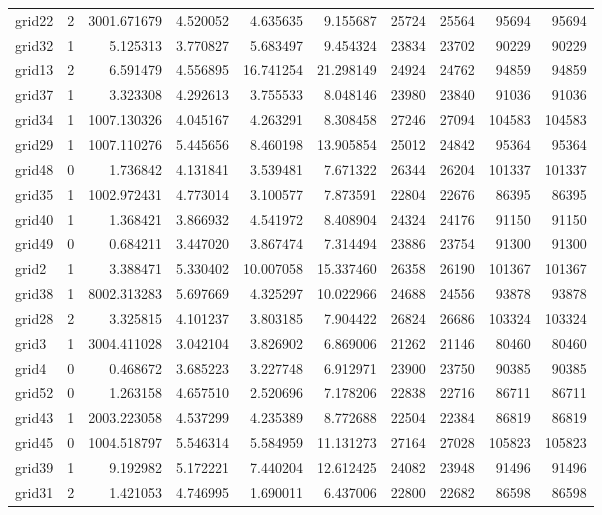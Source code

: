 \begin{longtable}{|l|r|r|r|r|r|r|r|r|r|}
grid22 & 2 & 3001.671679 & 4.520052 & 4.635635 & 9.155687 & 25724 & 25564 & 95694 & 95694 \\
grid32 & 1 & 5.125313 & 3.770827 & 5.683497 & 9.454324 & 23834 & 23702 & 90229 & 90229 \\
grid13 & 2 & 6.591479 & 4.556895 & 16.741254 & 21.298149 & 24924 & 24762 & 94859 & 94859 \\
grid37 & 1 & 3.323308 & 4.292613 & 3.755533 & 8.048146 & 23980 & 23840 & 91036 & 91036 \\
grid34 & 1 & 1007.130326 & 4.045167 & 4.263291 & 8.308458 & 27246 & 27094 & 104583 & 104583 \\
grid29 & 1 & 1007.110276 & 5.445656 & 8.460198 & 13.905854 & 25012 & 24842 & 95364 & 95364 \\
grid48 & 0 & 1.736842 & 4.131841 & 3.539481 & 7.671322 & 26344 & 26204 & 101337 & 101337 \\
grid35 & 1 & 1002.972431 & 4.773014 & 3.100577 & 7.873591 & 22804 & 22676 & 86395 & 86395 \\
grid40 & 1 & 1.368421 & 3.866932 & 4.541972 & 8.408904 & 24324 & 24176 & 91150 & 91150 \\
grid49 & 0 & 0.684211 & 3.447020 & 3.867474 & 7.314494 & 23886 & 23754 & 91300 & 91300 \\
grid2 & 1 & 3.388471 & 5.330402 & 10.007058 & 15.337460 & 26358 & 26190 & 101367 & 101367 \\
grid38 & 1 & 8002.313283 & 5.697669 & 4.325297 & 10.022966 & 24688 & 24556 & 93878 & 93878 \\
grid28 & 2 & 3.325815 & 4.101237 & 3.803185 & 7.904422 & 26824 & 26686 & 103324 & 103324 \\
grid3 & 1 & 3004.411028 & 3.042104 & 3.826902 & 6.869006 & 21262 & 21146 & 80460 & 80460 \\
grid4 & 0 & 0.468672 & 3.685223 & 3.227748 & 6.912971 & 23900 & 23750 & 90385 & 90385 \\
grid52 & 0 & 1.263158 & 4.657510 & 2.520696 & 7.178206 & 22838 & 22716 & 86711 & 86711 \\
grid43 & 1 & 2003.223058 & 4.537299 & 4.235389 & 8.772688 & 22504 & 22384 & 86819 & 86819 \\
grid45 & 0 & 1004.518797 & 5.546314 & 5.584959 & 11.131273 & 27164 & 27028 & 105823 & 105823 \\
grid39 & 1 & 9.192982 & 5.172221 & 7.440204 & 12.612425 & 24082 & 23948 & 91496 & 91496 \\
grid31 & 2 & 1.421053 & 4.746995 & 1.690011 & 6.437006 & 22800 & 22682 & 86598 & 86598 \\

\end{longtable}
